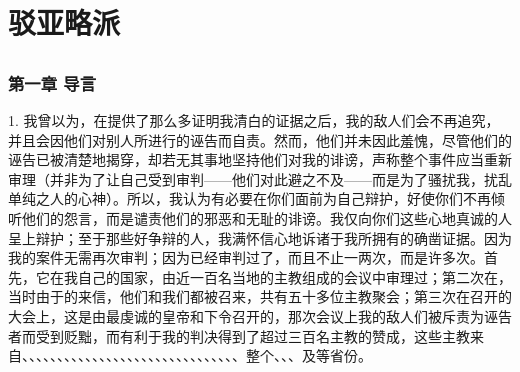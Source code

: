 
\chapter{驳亚略派}


 \newline{} \par



\section{}


\subsection{第一章 导言}

1. 我曾以为，在提供了那么多证明我清白的证据之后，我的敌人们会不再追究，并且会因他们对别人所进行的诬告而自责。然而，他们并未因此羞愧，尽管他们的诬告已被清楚地揭穿，却若无其事地坚持他们对我的诽谤，声称整个事件应当重新审理（并非为了让自己受到审判——他们对此避之不及——而是为了骚扰我，扰乱单纯之人的心神）。所以，我认为有必要在你们面前为自己辩护，好使你们不再倾听他们的怨言，而是谴责他们的邪恶和无耻的诽谤。我仅向你们这些心地真诚的人呈上辩护；至于那些好争辩的人，我满怀信心地诉诸于我所拥有的确凿证据。因为我的案件无需再次审判；因为已经审判过了，而且不止一两次，而是许多次。首先，它在我自己的国家，由近一百名当地的主教组成的会议中审理过；第二次在，当时由于的来信，他们和我们都被召来，共有五十多位主教聚会；第三次在召开的大会上，这是由最虔诚的皇帝和下令召开的，那次会议上我的敌人们被斥责为诬告者而受到贬黜，而有利于我的判决得到了超过三百名主教的赞成，这些主教来自、、、、、、、、、、、、、、、、、、、、、、、、、、、、、、、整个、、、及等省份。\par

